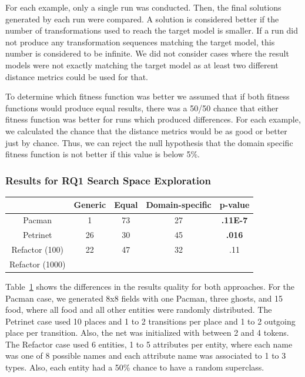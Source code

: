 For each example, only a single run was conducted. Then, the final solutions generated by each run were compared.
A solution is considered better if the number of transformations used to reach the target model is smaller. If a run did 
not produce any transformation sequences matching the target model, this number is considered to be infinite. We did not consider cases where 
the result models were not exactly matching the target model as at least two different distance metrics could be used for that.

To determine which fitness function was better we assumed that if both fitness functions would produce equal results,
there was a 50/50 chance that either fitness function was better for runs which produced differences.
For each example, we calculated the chance that the distance metrics would be as good or better just by chance.
Thus, we can reject the null hypothesis that the domain specific fitness function is not better if this value is below 5\%.



\subsubsection{Results for RQ1 Search Space Exploration}

\begin{table}
\begin{tabular}{|c|c|c|c|c|}
\hline
 & Generic & Equal & Domain-specific & p-value \\
\hline
Pacman & 1 & 73 & 27 & \textbf{.11E-7} \\
\hline
Petrinet & 26 & 30 & 45 & \textbf{.016} \\
\hline
Refactor (100) & 22 & 47 & 32 & .11 \\
\hline
Refactor (1000) & & & & \\
\hline
\end{tabular}
\label{tab:resultsrq1}
\end{table}

Table~\ref{tab:resultsrq1} shows the differences in the results quality for both approaches. For the Pacman case, we generated 8x8 fields with one Pacman, three ghosts, and 15 food, where all food and all other entities were randomly distributed. The Petrinet case used 10 places and 1 to 2 transitions per place and 1 to 2 outgoing place per transition. Also, the net was initialized with between 2 and 4 tokens. The Refactor case used 6 entities, 1 to 5 attributes per entity, where each name was one of 8 possible names and each attribute name was associated to 1 to 3 types. Also, each entity had a 50\% chance to have a random superclass. 

